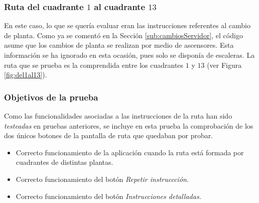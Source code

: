 \subsubsection{Ruta del cuadrante $1$ al cuadrante $13$}

En este caso, lo que se quería evaluar eran las instrucciones referentes al cambio de planta. Como ya se comentó en la Sección \ref{sub:cambiosServidor}, el código asume que los cambios de planta se realizan por medio de ascensores. Esta información se ha ignorado en esta ocasión, pues solo se disponía de escaleras. La ruta que se prueba es la comprendida entre los cuadrantes $1$ y $13$ (ver Figura \ref{fig:del1al13}).

\subsubsection*{Objetivos de la prueba}

Como las funcionalidades asociadas a las instrucciones de la ruta han sido \textit{testeadas} en pruebas anteriores, se incluye en esta prueba la comprobación de los dos únicos botones de la pantalla de ruta que quedaban por probar.

\begin{itemize}
	\item Correcto funcionamiento de la aplicación cuando la ruta está formada por cuadrantes de distintas plantas. 
	
	\item Correcto funcionamiento del botón \textit{Repetir instruccción}.
	
	\item Correcto funcionamiento del botón \textit{Instrucciones detalladas.}
\end{itemize}

